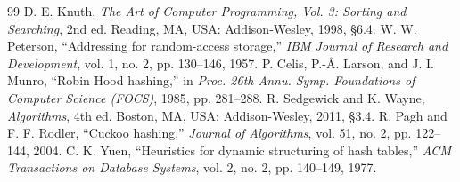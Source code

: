 \documentclass[twocolumn, 10pt, a4paper]{article}
\begin{document}
\begin{thebibliography}{99}
 D. E. Knuth, \emph{The Art of Computer Programming, Vol. 3: Sorting and Searching}, 2nd ed. Reading, MA, USA: Addison-Wesley, 1998, \S6.4.
 W. W. Peterson, ``Addressing for random-access storage,'' \emph{IBM Journal of Research and Development}, vol. 1, no. 2, pp. 130--146, 1957.
 P. Celis, P.-{\AA}. Larson, and J. I. Munro, ``Robin Hood hashing,'' in \emph{Proc. 26th Annu. Symp. Foundations of Computer Science (FOCS)}, 1985, pp. 281--288.
 R. Sedgewick and K. Wayne, \emph{Algorithms}, 4th ed. Boston, MA, USA: Addison-Wesley, 2011, \S3.4.
 R. Pagh and F. F. Rodler, ``Cuckoo hashing,'' \emph{Journal of Algorithms}, vol. 51, no. 2, pp. 122--144, 2004.
 C. K. Yuen, ``Heuristics for dynamic structuring of hash tables,'' \emph{ACM Transactions on Database Systems}, vol. 2, no. 2, pp. 140--149, 1977.
\end{thebibliography}
\end{document}
